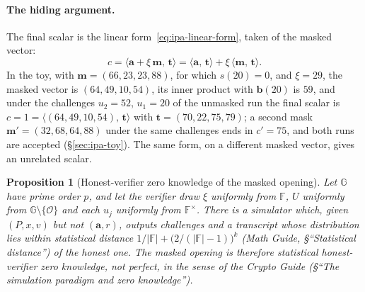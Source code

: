 \documentclass[11pt,a4paper]{article}
\newtheorem{proposition}[theorem]{Proposition}
\theoremstyle{definition}
\newcommand{\F}{\mathbb{F}}
\newcommand{\G}{\mathbb{G}}
\newcommand{\ip}[2]{\langle #1,\, #2 \rangle}
\begin{document}
\paragraph{The hiding argument.}
The final scalar is the linear form~\eqref{eq:ipa-linear-form}, taken
of the masked vector:
\begin{equation}\label{eq:ipa-sym-masked-scalar}
c = \ip{\mathbf a + \xi\,\mathbf m}{\mathbf t}
  = \ip{\mathbf a}{\mathbf t} + \xi\,\ip{\mathbf m}{\mathbf t} .
\end{equation}
In the toy, with $\mathbf m = (66, 23, 23, 88)$, for which $s(20) = 0$,
and $\xi = 29$, the masked vector is $(64, 49, 10, 54)$, its inner
product with $\mathbf b(20)$ is $59$, and under the challenges
$u_2 = 52$, $u_1 = 20$ of the unmasked run the final scalar is
$c = 1 = \ip{(64, 49, 10, 54)}{\mathbf t}$ with
$\mathbf t = (70, 22, 75, 79)$; a second mask
$\mathbf m' = (32, 68, 64, 88)$ under the same challenges ends in
$c' = 75$, and both runs are accepted (\S\ref{sec:ipa-toy}). The same
form, on a different masked vector, gives an unrelated scalar.

\begin{proposition}[Honest-verifier zero knowledge of the masked
  opening]\label{prop:ipa-hvzk}
Let $\G$ have prime order $p$, and let the verifier draw $\xi$
uniformly from $\F$, $U$ uniformly from $\G \setminus \{\mathcal O\}$
and each $u_j$ uniformly from $\F^{\times}$. There is a simulator
which, given $(P, x, v)$ but not $(\mathbf a, r)$, outputs challenges
and a transcript whose distribution lies within statistical distance
$1/|\F| + \bigl(2/(|\F| - 1)\bigr)^{k}$ (\emph{Math Guide},
\S``Statistical distance'') of the honest one. The masked opening is
therefore statistical honest-verifier zero knowledge, not perfect, in
the sense of the \emph{Crypto Guide} (\S``The simulation paradigm and
zero knowledge'').
\end{proposition}
\end{document}

